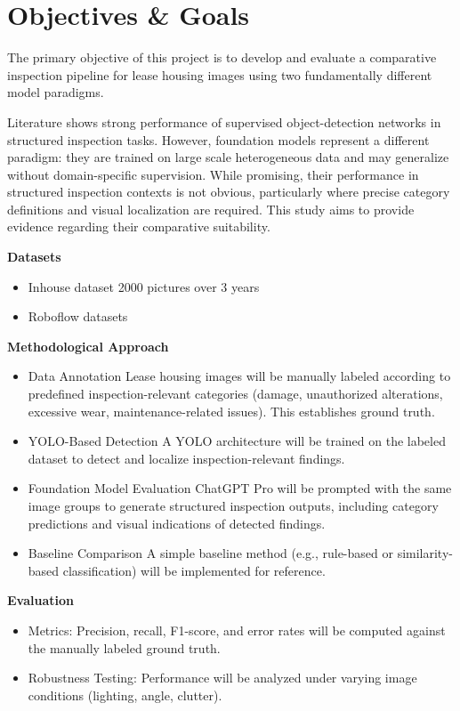 \section{Objectives \& Goals}
\label{sec:objectives_and_goals}

The primary objective of this project is to develop and evaluate a comparative inspection pipeline for lease housing images using two fundamentally different model paradigms.

Literature shows strong performance of supervised object-detection networks in structured inspection tasks. However, foundation models represent a different paradigm: they are trained on large scale heterogeneous data and may generalize without domain-specific supervision. While promising, their performance in structured inspection contexts is not obvious, particularly where precise category definitions and visual localization are required. This study aims to provide evidence regarding their comparative suitability.

\textbf{Datasets} \\
\begin{itemize}
\item Inhouse dataset 2000 pictures over 3 years
\item Roboflow datasets \cite{Roboflow}
\end{itemize}

\textbf{Methodological Approach} \\
\begin{itemize}
\item Data Annotation
Lease housing images will be manually labeled according to predefined inspection-relevant categories (damage, unauthorized alterations, excessive wear, maintenance-related issues). This establishes ground truth.

\item YOLO-Based Detection
A YOLO architecture will be trained on the labeled dataset to detect and localize inspection-relevant findings.

\item  Foundation Model Evaluation
ChatGPT Pro will be prompted with the same image groups to generate structured inspection outputs, including category predictions and visual indications of detected findings.

\item  Baseline Comparison
A simple baseline method (e.g., rule-based or similarity-based classification) will be implemented for reference.
\end{itemize}

\textbf{Evaluation}
\begin{itemize}
    \item Metrics: Precision, recall, F1-score, and error rates will be computed against the manually labeled ground truth.

    \item Robustness Testing: Performance will be analyzed under varying image conditions (lighting, angle, clutter).
\end{itemize}

